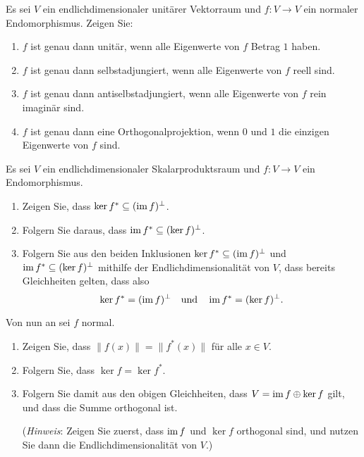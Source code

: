 \documentclass[a4paper,10pt]{scrartcl}
\begin{document}
\begin{question}
  Es sei $V$ ein endlichdimensionaler unitärer Vektorraum und $f \colon V \to V$ ein normaler Endomorphismus.
  Zeigen Sie:
  \begin{enumerate}[leftmargin=*]
    \item
      $f$ ist genau dann unitär, wenn alle Eigenwerte von $f$ Betrag $1$ haben.
    \item
      $f$ ist genau dann selbstadjungiert, wenn alle Eigenwerte von $f$ reell sind.
    \item
      $f$ ist genau dann antiselbstadjungiert, wenn alle Eigenwerte von $f$ rein imaginär sind.
    \item
      $f$ ist genau dann eine Orthogonalprojektion, wenn $0$ und $1$ die einzigen Eigenwerte von $f$ sind.
  \end{enumerate}
\end{question}


\begin{question}
  Es sei $V$ ein endlichdimensionaler Skalarproduktsraum und $f \colon V \to V$ ein Endomorphismus.
  \begin{enumerate}[leftmargin=*]
    \item
      Zeigen Sie, dass $\ker f^* \subseteq (\operatorname{im} f)^\perp$.
    \item
      Folgern Sie daraus, dass $\operatorname{im} f^* \subseteq (\ker f)^\perp$.
    \item
      Folgern Sie aus den beiden Inklusionen $\ker f^* \subseteq (\operatorname{im} f)^\perp$ und $\operatorname{im} f^* \subseteq (\ker f)^\perp$ mithilfe der Endlichdimensionalität von $V$, dass bereits Gleichheiten gelten, dass also
      \[
        \ker f^* = (\operatorname{im} f)^\perp
        \quad\text{und}\quad
        \operatorname{im} f^* = (\ker f)^\perp.
      \]
  \end{enumerate}
  Von nun an sei $f$ normal.
  \begin{enumerate}[leftmargin=*, resume]
    \item
      Zeigen Sie, dass $\|f(x)\| = \|f^*(x)\|$ für alle $x \in V$.
    \item
      Folgern Sie, dass $\ker f = \ker f^*$.
    \item
      Folgern Sie damit aus den obigen Gleichheiten, dass $V = \operatorname{im} f \oplus \ker f$ gilt, und dass die Summe orthogonal ist.
      
      (\emph{Hinweis}:
       Zeigen Sie zuerst, dass $\operatorname{im} f$ und $\ker f$ orthogonal sind, und nutzen Sie dann die Endlichdimensionalität von $V$.)
  \end{enumerate}
\end{question}
\end{document}
